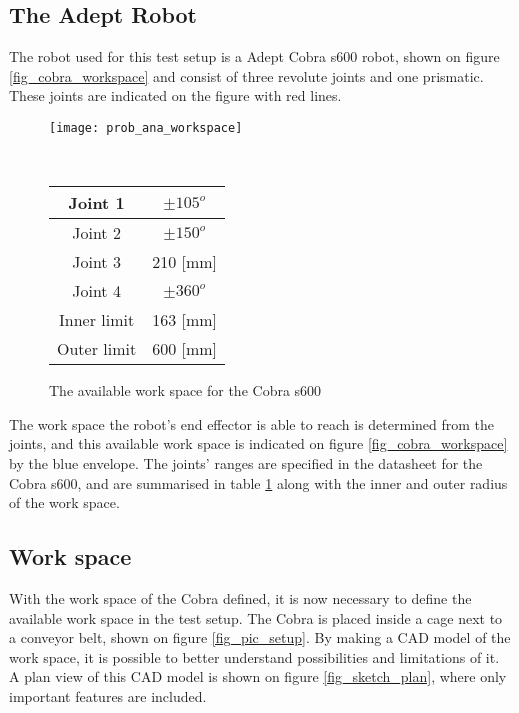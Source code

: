 \subsection{The Adept Robot} 
The robot used for this test setup is a Adept Cobra s600 robot, shown on figure \ref{fig_cobra_workspace} and consist of three revolute joints and one prismatic. These joints are indicated on the figure with red lines.
\begin{figure}[htbp!]
\centering
\begin{minipage}[t]{.6\textwidth}
\centering
\vspace{0pt}
\texttt{[image: prob\_ana\_workspace]}
\caption{The available work space for the Cobra s600 \citep[modified]{cobra}}
  \label{fig_cobra_workspace}
\end{minipage}~~
\begin{minipage}[t]{.35\textwidth}
\centering
\vspace{2.85cm}
  \begin{tabular}{c|c}
Joint 1 & $\pm 105^o$\\\hline
Joint 2 & $\pm 150^o$\\\hline
Joint 3 & 210 [mm]\\\hline
Joint 4 & $\pm 360^o$\\\hline
Inner limit & 163 [mm]\\\hline
Outer limit & 600 [mm]\\

  \end{tabular}
  \vspace{2.85cm}
  \label{tab_joints}
\end{minipage}
\end{figure}\newline
\noindent The work space the robot's end effector is able to reach is determined from the joints, and this available work space is indicated on figure \ref{fig_cobra_workspace} by the blue envelope. The joints' ranges are specified in the datasheet for the Cobra s600, and are summarised in table \ref{tab_joints} along with the inner and outer radius of the work space.\clearpage


 \subsection{Work space} \label{sub_work_space}
With the work space of the Cobra defined, it is now necessary to define the available work space in the test setup. The Cobra is placed inside a cage next to a conveyor belt, shown on figure \ref{fig_pic_setup}. By making a CAD model of the work space, it is possible to better understand possibilities and limitations of it. A plan view of this CAD model is shown on figure \ref{fig_sketch_plan}, where only important features are included.

